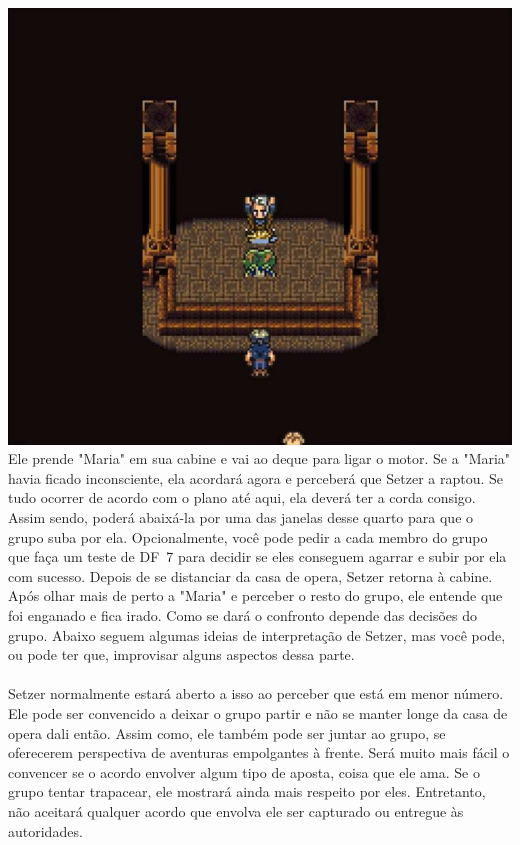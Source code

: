 \includegraphics[width=\columnwidth]{./art/mariaanddraco/setzer.jpg} 
%
\ofpar\\
%
Ele prende "Maria" em sua cabine e vai ao deque para ligar o motor.
Se a "Maria" havia ficado inconsciente, ela acordará agora e perceberá que Setzer a raptou.
Se tudo ocorrer de acordo com o plano até aqui, ela deverá ter a corda consigo. Assim sendo, poderá abaixá-la por uma das janelas desse quarto para que o grupo suba por ela. Opcionalmente, você pode pedir a cada membro do grupo que faça um teste de DF~7 para decidir se eles conseguem agarrar e subir por ela com sucesso.
Depois de se distanciar da casa de opera, Setzer retorna à cabine. Após olhar mais de perto a "Maria" e perceber o resto do grupo, ele entende que foi enganado e fica irado.
Como se dará o confronto depende das decisões do grupo. Abaixo seguem algumas ideias de interpretação de Setzer, mas você pode, ou pode ter que, improvisar alguns aspectos dessa parte.
%
\ofpar\\
%
\\
Setzer normalmente estará aberto a isso ao perceber que está em menor número.
Ele pode ser convencido a deixar o grupo partir e não se manter longe da casa de opera dali então. Assim como, ele também pode ser juntar ao grupo, se oferecerem perspectiva de aventuras empolgantes à frente.
Será muito mais fácil o convencer se o acordo envolver algum tipo de aposta, coisa que ele ama.
Se o grupo tentar trapacear, ele mostrará ainda mais respeito por eles. Entretanto, não aceitará qualquer acordo que envolva ele ser capturado ou entregue às autoridades.
